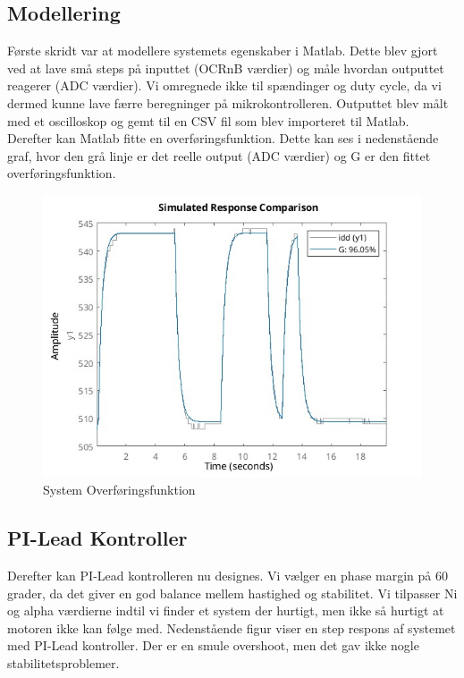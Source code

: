 \documentclass[../main.tex]{subfiles}
\begin{document}
\subsection{Modellering}
Første skridt var at modellere systemets egenskaber i Matlab. Dette blev gjort ved at lave små steps på inputtet (OCRnB værdier) og måle hvordan outputtet reagerer (ADC værdier). Vi omregnede ikke til spændinger og duty cycle, da vi dermed kunne lave færre beregninger på mikrokontrolleren. Outputtet blev målt med et oscilloskop og gemt til en CSV fil som blev importeret til Matlab. Derefter kan Matlab fitte en overføringsfunktion. Dette kan ses i nedenstående graf, hvor den grå linje er det reelle output (ADC værdier) og G er den fittet overføringsfunktion. 

\begin{figure}[H]
      \includegraphics[width=\textwidth]{Dokumentation/Figures/Motor Model Fit.jpg}
     \caption{System Overføringsfunktion}
     \label{fig: System Overføringsfunktion}
     \end{figure}

\subsection{PI-Lead Kontroller}
Derefter kan PI-Lead kontrolleren nu designes. Vi vælger en phase margin på 60 grader, da det giver en god balance mellem hastighed og stabilitet. Vi tilpasser Ni og alpha værdierne indtil vi finder et system der hurtigt, men ikke så hurtigt at motoren ikke kan følge med. Nedenstående figur viser en step respons af systemet med PI-Lead kontroller. Der er en smule overshoot, men det gav ikke nogle stabilitetsproblemer.
\end{document}
